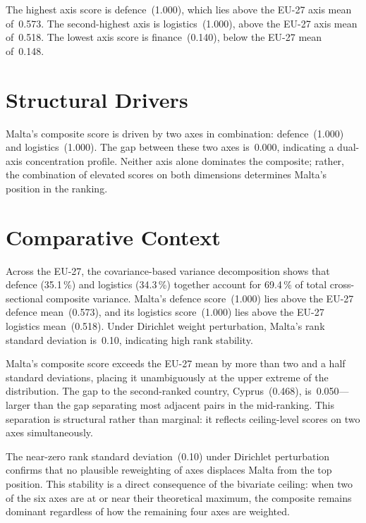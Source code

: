 \documentclass[12pt,a4paper]{article}
\begin{document}
The highest axis score is defence~(1.000), which lies above the EU-27 axis mean of~0.573.  The second-highest axis is logistics~(1.000), above the EU-27 axis mean of~0.518.  The lowest axis score is finance~(0.140), below the EU-27 mean of~0.148.


\section{Structural Drivers}
\label{sec:drivers}

\begin{sloppypar}
Malta's composite score is driven by two axes in combination: defence~(1.000) and logistics~(1.000).  The gap between these two axes is~0.000, indicating a dual-axis concentration profile.  Neither axis alone dominates the composite; rather, the combination of elevated scores on both dimensions determines Malta's position in the ranking.
\end{sloppypar}


\section{Comparative Context}
\label{sec:comparative}

Across the EU-27, the covariance-based variance decomposition shows that defence (35.1\,\%) and logistics (34.3\,\%) together account for 69.4\,\% of total cross-sectional composite variance.  Malta's defence score~(1.000) lies above the EU-27 defence mean~(0.573), and its logistics score~(1.000) lies above the EU-27 logistics mean~(0.518).  Under Dirichlet weight perturbation, Malta's rank standard deviation is~0.10, indicating high rank stability.



Malta's composite score exceeds the EU-27 mean by more than two and a half standard deviations, placing it unambiguously at the upper extreme of the distribution.  The gap to the second-ranked country, Cyprus~(0.468), is~0.050---larger than the gap separating most adjacent pairs in the mid-ranking.  This separation is structural rather than marginal: it reflects ceiling-level scores on two axes simultaneously.

The near-zero rank standard deviation~(0.10) under Dirichlet perturbation confirms that no plausible reweighting of axes displaces Malta from the top position.  This stability is a direct consequence of the bivariate ceiling: when two of the six axes are at or near their theoretical maximum, the composite remains dominant regardless of how the remaining four axes are weighted.
\end{document}
